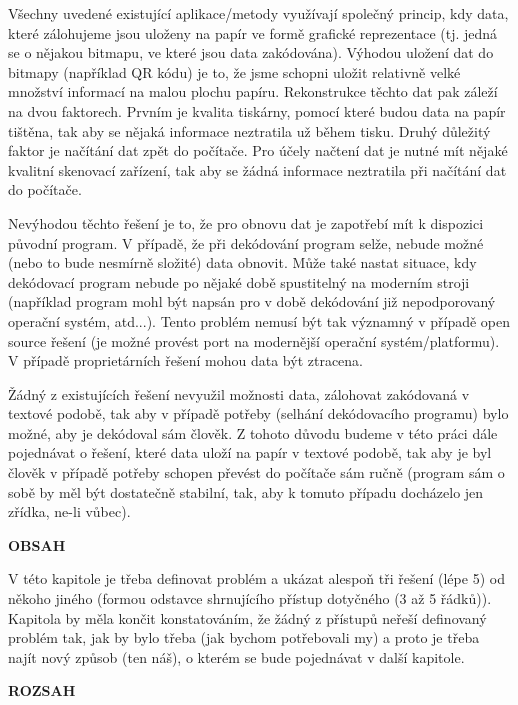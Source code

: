\documentclass[conference]{IEEEtran}
\begin{document}

Všechny uvedené existující aplikace/metody využívají společný princip, kdy data, které zálohujeme jsou uloženy na papír ve formě grafické reprezentace (tj. jedná se o nějakou bitmapu, ve které jsou data zakódována). Výhodou uložení dat do bitmapy (například QR kódu) je to, že jsme schopni uložit relativně velké množství informací na malou plochu papíru. Rekonstrukce těchto dat pak záleží na dvou faktorech. Prvním je kvalita tiskárny, pomocí které budou data na papír tištěna, tak aby se nějaká informace neztratila už během tisku. Druhý důležitý faktor je načítání dat zpět do počítače. Pro účely načtení dat je nutné mít nějaké kvalitní skenovací zařízení, tak aby se žádná informace neztratila při načítání dat do počítače. 

Nevýhodou těchto řešení je to, že pro obnovu dat je zapotřebí mít k dispozici původní program. V případě, že při dekódování program selže, nebude možné (nebo to bude nesmírně složité) data obnovit. Může také nastat situace, kdy dekódovací program nebude po nějaké době spustitelný na moderním stroji (například program mohl být napsán pro v době dekódování již nepodporovaný operační systém, atd...). Tento problém nemusí být tak významný v případě open source řešení (je možné provést port na modernější operační systém/platformu). V případě proprietárních řešení mohou data být ztracena.

Žádný z existujících řešení nevyužil možnosti data, zálohovat zakódovaná v textové podobě, tak aby v případě potřeby (selhání dekódovacího programu) bylo možné, aby je dekódoval sám člověk. Z tohoto důvodu budeme v této práci dále pojednávat o řešení, které data uloží na papír v textové podobě, tak aby je byl člověk v případě potřeby schopen převést do počítače sám ručně (program sám o sobě by měl být dostatečně stabilní, tak, aby k tomuto případu docházelo jen zřídka, ne-li vůbec). 



\textbf{OBSAH}

V této kapitole je třeba definovat problém a ukázat alespoň tři řešení (lépe 5) od někoho jiného (formou odstavce shrnujícího přístup dotyčného (3 až 5 řádků)). Kapitola by měla končit konstatováním, že žádný z přístupů neřeší definovaný problém tak, jak by bylo třeba (jak bychom potřebovali my) a proto je třeba najít nový způsob (ten náš), o kterém se bude pojednávat v další kapitole.

\textbf{ROZSAH}
\end{document}
